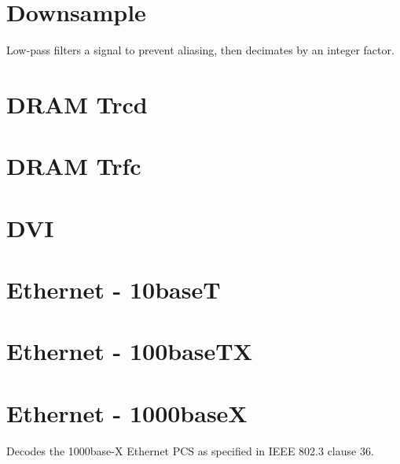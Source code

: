 \section{Downsample}

Low-pass filters a signal to prevent aliasing, then decimates by an integer factor.

\pagebreak
\section{DRAM Trcd}

\pagebreak
\section{DRAM Trfc}

\pagebreak
\section{DVI}
\label{filter:dvi}

\pagebreak
\section{Ethernet - 10baseT}

\pagebreak
\section{Ethernet - 100baseTX}

\pagebreak
\section{Ethernet - 1000baseX}
\label{proto:1000basex}

Decodes the 1000base-X Ethernet PCS as specified in IEEE 802.3 clause 36.

